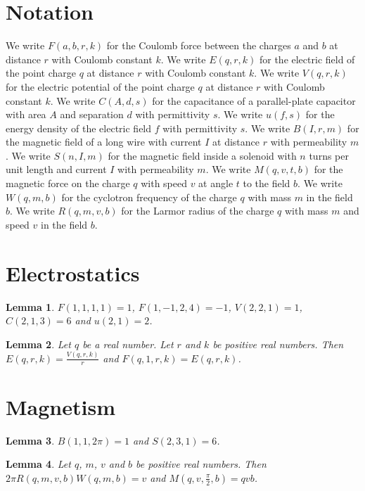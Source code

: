 \documentclass{article}
\newtheorem{lemma}{Lemma}
\begin{document}
\section{Notation}

We write $F(a,b,r,k)$ for the Coulomb force between the charges $a$ and $b$ at distance $r$ with Coulomb constant $k$.
We write $E(q,r,k)$ for the electric field of the point charge $q$ at distance $r$ with Coulomb constant $k$.
We write $V(q,r,k)$ for the electric potential of the point charge $q$ at distance $r$ with Coulomb constant $k$.
We write $C(A,d,s)$ for the capacitance of a parallel-plate capacitor with area $A$ and separation $d$ with permittivity $s$.
We write $u(f,s)$ for the energy density of the electric field $f$ with permittivity $s$.
We write $B(I,r,m)$ for the magnetic field of a long wire with current $I$ at distance $r$ with permeability $m$.
We write $S(n,I,m)$ for the magnetic field inside a solenoid with $n$ turns per unit length and current $I$ with permeability $m$.
We write $M(q,v,t,b)$ for the magnetic force on the charge $q$ with speed $v$ at angle $t$ to the field $b$.
We write $W(q,m,b)$ for the cyclotron frequency of the charge $q$ with mass $m$ in the field $b$.
We write $R(q,m,v,b)$ for the Larmor radius of the charge $q$ with mass $m$ and speed $v$ in the field $b$.

\section{Electrostatics}

\begin{lemma}\label{values}
$F(1,1,1,1)=1$, $F(1,-1,2,4)=-1$, $V(2,2,1)=1$, $C(2,1,3)=6$ and $u(2,1)=2$.
\end{lemma}

\begin{lemma}\label{field}
Let $q$ be a real number. Let $r$ and $k$ be positive real numbers. Then $E(q,r,k)=\frac{V(q,r,k)}{r}$ and $F(q,1,r,k)=E(q,r,k)$.
\end{lemma}

\section{Magnetism}

\begin{lemma}\label{wires}
$B(1,1,2\pi)=1$ and $S(2,3,1)=6$.
\end{lemma}

\begin{lemma}\label{cyclotron}
Let $q$, $m$, $v$ and $b$ be positive real numbers. Then $2\pi R(q,m,v,b)W(q,m,b)=v$ and $M(q,v,\frac{\pi}{2},b)=qvb$.
\end{lemma}
\end{document}
